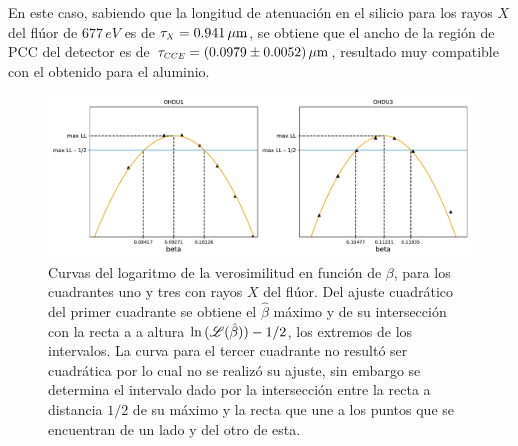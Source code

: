 En este caso, sabiendo que la longitud de atenuación en el silicio para los rayos $X$ del flúor de $677\,\si{eV}$ es de $\tau_{\scaleto{X}{4pt}} = 0.941\,\si{\mu m}$\cite{AttenuationLength}, se obtiene que el ancho de la región de PCC del detector es de $\tau_{\scaleto{CCE}{4pt}} = (0.0979 \pm 0.0052)\,\si{\mu m}$, resultado muy compatible con el obtenido para el aluminio.
\begin{figure}[h]
    \centering
    \includegraphics[scale=0.5]{Figs/F_barridos_beta.pdf}
    \caption{Curvas del logaritmo de la verosimilitud en función de $\beta$, para los cuadrantes uno y tres con rayos $X$ del flúor. Del ajuste cuadrático del primer cuadrante se obtiene el $\hat{\beta}$ máximo y de su intersección con la recta a a altura $\ln{(\mathscr{L}(\hat{\beta}))} - 1/2$, los extremos de los intervalos. La curva para el tercer cuadrante no resultó ser cuadrática por lo cual no se realizó su ajuste, sin embargo se determina el intervalo dado por la intersección entre la recta a distancia $1/2$ de su máximo y la recta que une a los puntos que se encuentran de un lado y del otro de esta.}
    \label{fig:F_barridos_beta}
\end{figure}

